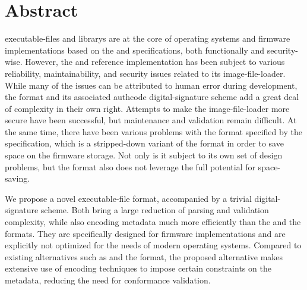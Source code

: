 \cleardoublepage
{}
\chapter*{Abstract}

\saveparinfos
\begin{center}
  \begin{minipage}[t]{0.7\textwidth}
    \useparinfo

    \noindent\Glspl{executable-file} and \glspl{library} are at the core of operating systems and \gls{firmware} implementations based on the  and  specifications, both functionally and security-wise. However, the  and  reference implementation  has been subject to various reliability, maintainability, and security issues related to its  \gls{image-file-loader}. While many of the issues can be attributed to human error during development, the  format and its associated \gls{authcode} \gls{digital-signature} scheme add a great deal of complexity in their own right. Attempts to make the   \gls{image-file-loader} more secure have been successful, but maintenance and validation remain difficult. At the same time, there have been various problems with the  format specified by the  specification, which is a stripped-down variant of the  format in order to save space on the \gls{firmware} storage. Not only is it subject to its own set of design problems, but the format also does not leverage the full potential for space-saving.

    We propose a novel \gls{executable-file} format, accompanied by a trivial \gls{digital-signature} scheme. Both bring a large reduction of parsing and validation complexity, while also encoding metadata much more efficiently than the  and the  formats. They are specifically designed for  \gls{firmware} implementations and are explicitly not optimized for the needs of modern operating systems. Compared to existing alternatives such as  and the  format, the proposed alternative makes extensive use of encoding techniques to impose certain constraints on the metadata, reducing the need for conformance validation.
  \end{minipage}
\end{center}

\vfill
